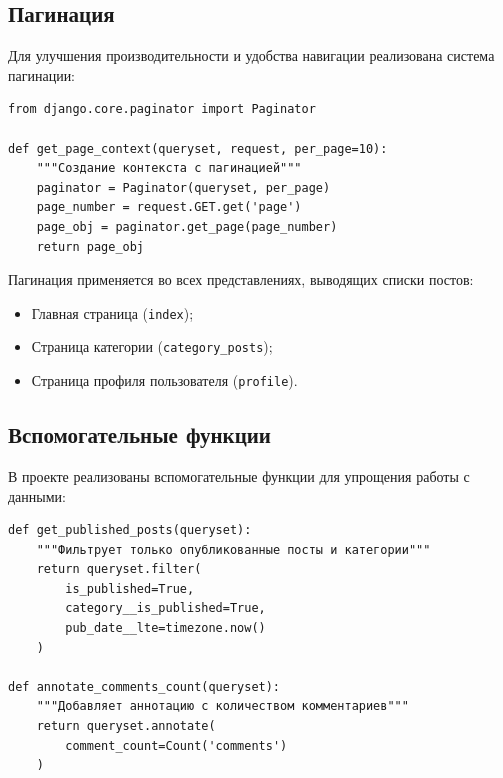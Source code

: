 \documentclass[pract,och,bachelor]{SCWorks}
\begin{document}
\subsection{Пагинация}

Для улучшения производительности и удобства навигации реализована система пагинации:

\begin{listing}[H]
\begin{verbatim}
from django.core.paginator import Paginator

def get_page_context(queryset, request, per_page=10):
    """Создание контекста с пагинацией"""
    paginator = Paginator(queryset, per_page)
    page_number = request.GET.get('page')
    page_obj = paginator.get_page(page_number)
    return page_obj
\end{verbatim}
\caption{Функция создания пагинатора}
\end{listing}

Пагинация применяется во всех представлениях, выводящих списки постов:
\begin{itemize}
    \item Главная страница (\texttt{index});
    \item Страница категории (\texttt{category\_posts});
    \item Страница профиля пользователя (\texttt{profile}).
\end{itemize}

\subsection{Вспомогательные функции}

В проекте реализованы вспомогательные функции для упрощения работы с данными:

\begin{listing}[H]
\begin{verbatim}
def get_published_posts(queryset):
    """Фильтрует только опубликованные посты и категории"""
    return queryset.filter(
        is_published=True,
        category__is_published=True,
        pub_date__lte=timezone.now()
    )

def annotate_comments_count(queryset):
    """Добавляет аннотацию с количеством комментариев"""
    return queryset.annotate(
        comment_count=Count('comments')
    )
\end{verbatim}
\caption{Вспомогательные функции для работы с QuerySet}
\end{listing}
\end{document}

